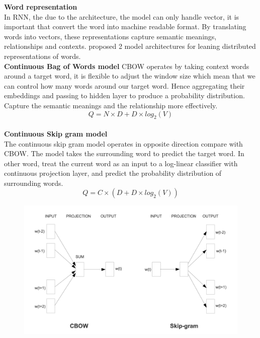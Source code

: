 \documentclass[12pt,a4paper]{article}
\begin{document}
\textbf{Word representation}
\\[1ex]
In RNN, the due to the architecture, the model can only handle vector, it is important that convert the word into machine readable format. By translating words into vectors, these representations capture semantic meanings, relationships and contexts. \parencite{mikolov2013efficient} proposed 2 model architectures for leaning distributed representations of words.
\\[1ex]
\textbf{Continuous Bag of Words model}
CBOW operates by taking context words around a target word, it is flexible to adjust the window size which mean that we can control how many words around our target word. Hence aggregating their embeddings and passing to hidden layer to produce a probability distribution. Capture the semantic meanings and the relationship more effectively. 
\begin{equation}
    Q = N \times D + D \times log_2(V)
\end{equation}
\\[1ex]
\textbf{Continuous Skip gram model}
\\[1ex]
The continuous skip gram model operates in opposite direction compare with CBOW. The model takes the surrounding word to predict the target word. In other word, treat the current word as an input to a log-linear classifier with continuous projection layer, and predict the probability distribution of surrounding words.
\begin{equation}
    Q = C \times (D + D \times log_2(V))
\end{equation}
\begin{figure}[!htb]
    \centering
    \includegraphics[width=1\textwidth]{../Pic/word_representation.png} %
\end{figure}
\newpage
\end{document}
